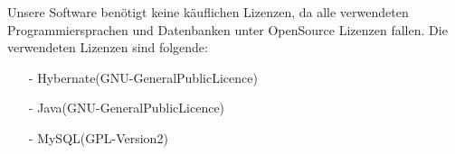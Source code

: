 \documentclass[../../Pflichtenheft.tex]{subfiles}
\begin{document}
    Unsere Software benötigt keine käuflichen Lizenzen, da alle verwendeten Programmiersprachen und Datenbanken unter OpenSource Lizenzen fallen.
    Die verwendeten Lizenzen sind folgende:
    \begin{itemize}
        \item[-] Hybernate(GNU-GeneralPublicLicence)
        \item[-] Java(GNU-GeneralPublicLicence)
        \item[-] MySQL(GPL-Version2)
    \end{itemize}
\end{document}
